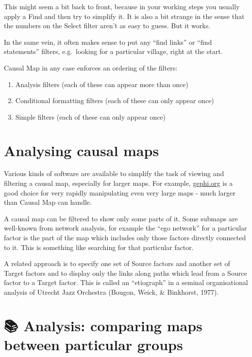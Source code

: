 \documentclass[
]{book}
\begin{document}
This might seem a bit back to front, because in your working steps you usually apply a Find and then try to simplify it. It is also a bit strange in the sense that the numbers on the Select filter aren't as easy to guess. But it works.

In the same vein, it often makes sense to put any ``find links'' or ``find statements'' filters, e.g.~looking for a particular village, right at the start.

Causal Map in any case enforces an ordering of the filters:

\begin{enumerate}
\def\labelenumi{\arabic{enumi})}
\item
  Analysis filters (each of these can appear more than once)
\item
  Conditional formatting filters (each of these can only appear once)
\item
  Simple filters (each of these can only appear once)
\end{enumerate}

\hypertarget{xanalysis}{%
\chapter{Analysing causal maps}\label{xanalysis}}

Various kinds of software are available to simplify the task of viewing and filtering a causal map, especially for larger maps. For example, \href{http://gephi.org}{gephi.org} is a good choice for very rapidly manipulating even very large maps - much larger than Causal Map can handle.

A causal map can be filtered to show only some parts of it. Some submaps are well-known from network analysis, for example the ``ego network'' for a particular factor is the part of the map which includes only those factors directly connected to it. This is something like searching for that particular factor.

A related approach is to specify one set of Source factors and another set of Target factors and to display only the links along paths which lead from a Source factor to a Target factor. This is called an ``etiograph'' in a seminal organisational analysis of Utrecht Jazz Orchestra (Bougon, Weick, \& Binkhorst, 1977).

\hypertarget{comparing}{%
\chapter{📚 Analysis: comparing maps between particular groups}\label{comparing}}
\end{document}
